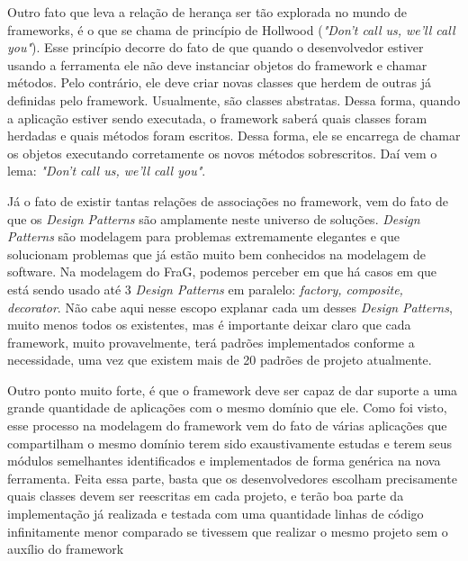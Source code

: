 \documentclass[
    12pt,       %
    openright,      %
    twoside,      %
    a4paper,      %
    english,      %
    french,       %
    spanish,      %
    brazil,       %
    ]{abntex2}
\begin{document}
          Outro fato que leva a relação de herança ser tão explorada no mundo de frameworks,
          é o que se chama de princípio de Hollwood (\textit{"Don't call us, we'll call you"}).
          Esse princípio decorre do fato de que quando o desenvolvedor estiver usando a
          ferramenta ele não deve instanciar objetos do framework e chamar métodos. Pelo
          contrário, ele deve criar novas classes que herdem de outras já definidas pelo
          framework. Usualmente, são classes abstratas. Dessa forma, quando a aplicação
          estiver sendo executada, o framework saberá quais classes foram herdadas e
          quais métodos foram escritos. Dessa forma, ele se encarrega de chamar
          os objetos executando corretamente os novos métodos sobrescritos. Daí
          vem o lema: \textit{"Don't call us, we'll call you"}.

          Já o fato de existir tantas relações de associações no framework, vem
          do fato de que os \textit{Design Patterns} são amplamente neste universo de
          soluções. \textit{Design Patterns} são modelagem para problemas extremamente
          elegantes e que solucionam problemas que já estão muito bem conhecidos na
          modelagem de software. Na modelagem do FraG, podemos perceber em que há
          casos em que está sendo usado até 3 \textit{Design Patterns} em paralelo:
          \textit{factory, composite, decorator}. Não cabe aqui nesse escopo explanar
          cada um desses \textit{Design Patterns}, muito menos todos os existentes,
          mas é importante deixar claro que cada framework, muito provavelmente, terá
          padrões implementados conforme a necessidade, uma vez que existem mais de
          20 padrões de projeto atualmente.

          Outro ponto muito forte, é que o framework deve ser capaz de dar suporte a
          uma grande quantidade de aplicações com o mesmo domínio que ele. Como foi
          visto, esse processo na modelagem do framework vem do fato de várias
          aplicações que compartilham o mesmo domínio terem sido exaustivamente
          estudas e terem seus módulos semelhantes identificados e implementados
          de forma genérica na nova ferramenta. Feita essa parte, basta que
          os desenvolvedores escolham precisamente quais classes devem ser reescritas
          em cada projeto, e terão boa parte da implementação já realizada e testada
          com uma quantidade linhas de código infinitamente menor comparado se
          tivessem que realizar o mesmo projeto sem o auxílio do framework
\end{document}
